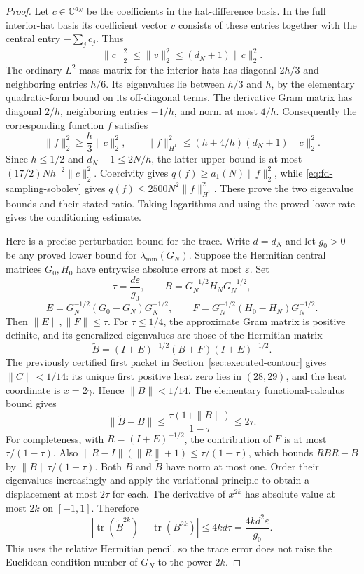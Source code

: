 \begin{proof}
Let \(c\in\mathbb C^{d_N}\) be the coefficients in the
hat-difference basis. In the full interior-hat basis its coefficient
vector \(v\) consists of these entries together with the central
entry \(-\sum_jc_j\). Thus
\[
 \|c\|_2^2\le\|v\|_2^2\le(d_N+1)\|c\|_2^2.
\]
The ordinary \(L^2\) mass matrix for the interior hats has diagonal
\(2h/3\) and neighboring entries \(h/6\). Its eigenvalues lie
between \(h/3\) and \(h\), by the elementary quadratic-form
bound on its off-diagonal terms. The derivative Gram matrix has
diagonal \(2/h\), neighboring entries \(-1/h\), and norm at
most \(4/h\). Consequently the corresponding function \(f\)
satisfies
\[
 \|f\|_2^2\ge\frac h3\|c\|_2^2,
 \qquad
 \|f\|_{H^1}^2\le(h+4/h)(d_N+1)\|c\|_2^2.
\]
Since \(h\le1/2\) and \(d_N+1\le2N/h\), the latter upper
bound is at most \((17/2)Nh^{-2}\|c\|_2^2\).
Coercivity gives \(q(f)\ge a_1(N)\|f\|_2^2\), while
\eqref{eq:fd-sampling-sobolev} gives
\(q(f)\le2500N^2\|f\|_{H^1}^2\). These prove the two
eigenvalue bounds and their stated ratio. Taking logarithms and
using the proved lower rate gives the conditioning estimate.

Here is a precise perturbation bound for the trace. Write \(d=d_N\)
and let \(g_0>0\) be any proved lower bound for
\(\lambda_{\min}(G_N)\). Suppose the Hermitian central matrices
\(G_0,H_0\) have entrywise absolute errors at most \(\varepsilon\).
Set
\[
 \tau=\frac{d\varepsilon}{g_0},\qquad
 B=G_N^{-1/2}H_NG_N^{-1/2},
\]
\[
 E=G_N^{-1/2}(G_0-G_N)G_N^{-1/2},\qquad
 F=G_N^{-1/2}(H_0-H_N)G_N^{-1/2}.
\]
Then \(\|E\|,\|F\|\le\tau\). For \(\tau\le1/4\),
the approximate Gram matrix is positive definite, and its generalized
eigenvalues are those of the Hermitian matrix
\[
 \widetilde B=(I+E)^{-1/2}(B+F)(I+E)^{-1/2}.
\]
The previously certified first packet in
Section~\ref{sec:executed-contour} gives \(\|C\|<1/14\):
its unique first positive heat zero lies in \((28,29)\), and the
heat coordinate is \(x=2\gamma\). Hence \(\|B\|<1/14\).
The elementary functional-calculus bound gives
\[
 \|\widetilde B-B\|
 \le\frac{\tau(1+\|B\|)}{1-\tau}\le2\tau.
\]
For completeness, with \(R=(I+E)^{-1/2}\), the contribution of
\(F\) is at most \(\tau/(1-\tau)\). Also
\(\|R-I\|(\|R\|+1)\le\tau/(1-\tau)\), which bounds
\(RBR-B\) by \(\|B\|\tau/(1-\tau)\).
Both \(B\) and \(\widetilde B\) have norm at most one.
Order their eigenvalues increasingly and apply the variational
principle to obtain a displacement at most \(2\tau\) for each.
The derivative of \(x^{2k}\) has absolute value at most \(2k\)
on \([-1,1]\). Therefore
\[
 \left|\operatorname{tr}(\widetilde B^{2k})
              -\operatorname{tr}(B^{2k})\right|
 \le4kd\tau
 =\frac{4kd^2\varepsilon}{g_0}.
\]
This uses the relative Hermitian pencil, so the trace error does not
raise the Euclidean condition number of \(G_N\) to the power \(2k\).


\end{proof}
